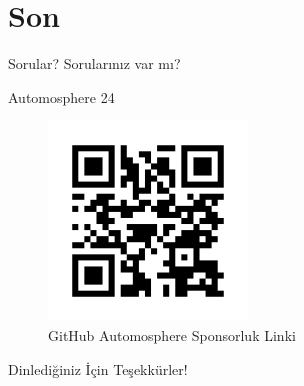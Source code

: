 \documentclass{beamer}
\begin{document}
\section{Son}
\begin{frame}{Sorular?}
    \centering
    \Huge Sorularınız var mı?
\end{frame}

\begin{frame}{Automosphere 24}
\begin{figure}
    \centering
    \includegraphics[width=0.5\linewidth]{img/automosphere24.png}
    \caption{GitHub Automosphere Sponsorluk Linki}
    \label{fig:enter-label}
\end{figure}
\end{frame}






\begin{frame}
    \centering
    \Huge Dinlediğiniz İçin Teşekkürler!
\end{frame}
\end{document}
